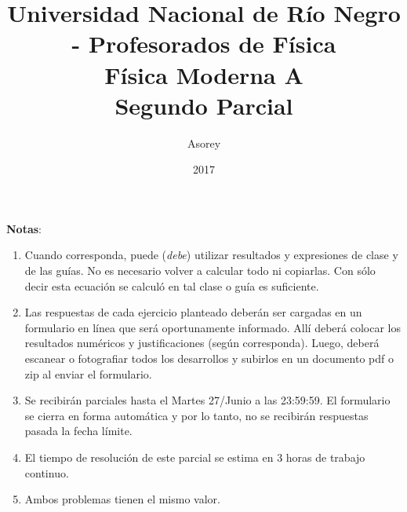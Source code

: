 \documentclass[a4paper,12pt]{article}
\begin{document}
\title{
{\normalsize{Universidad Nacional de Río Negro - Profesorados de Física}}\\
Física Moderna A \\ Segundo Parcial\\}
\author{Asorey}
\date{2017}
\maketitle

{\bf{Notas}}:
\begin{enumerate}
	\item Cuando corresponda, puede ({\textit{debe}}) utilizar resultados y
		expresiones de clase y de las guías. No es necesario volver a calcular
		todo ni copiarlas. Con sólo decir esta ecuación se calculó en tal clase
		o guía es suficiente.
	\item Las respuestas de cada ejercicio planteado deberán ser cargadas en un
		formulario en línea que será oportunamente informado. Allí deberá
		colocar los resultados numéricos y justificaciones (según corresponda).
		Luego, deberá escanear o fotografiar todos los desarrollos y subirlos
		en un documento pdf o zip al enviar el formulario.
	\item Se recibirán parciales hasta el Martes 27/Junio a las 23:59:59. El
		formulario se cierra en forma automática y por lo tanto, no se
		recibirán respuestas pasada la fecha límite. 
	\item El tiempo de resolución de este parcial se estima en 3 horas de
		trabajo continuo. 
	\item Ambos problemas tienen el mismo valor.
\end{enumerate}
\end{document}
